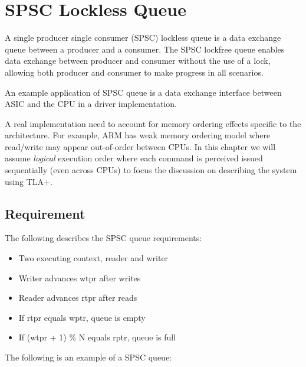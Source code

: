 % 

\chapter{SPSC Lockless Queue}

A single producer single consumer (SPSC) lockless queue is a data exchange queue
between a producer and a consumer. The SPSC lockfree queue enables data exchange
between producer and consumer without the use of a lock, allowing both producer
and consumer to make progress in all scenarios.\newline

An example application of SPSC queue is a data exchange interface between ASIC
and the CPU in a driver implementation.\newline

A real implementation need to account for memory ordering effects specific to
the architecture. For example, ARM has weak memory ordering model where
read/write may appear out-of-order between CPUs. In this chapter we will assume
\textit{logical} execution order where each command is perceived issued
sequentially (even across CPUs) to focus the discussion on describing the system
using TLA+.
\newline

\section{Requirement}

The following describes the SPSC queue requirements: 

\begin{itemize}
    \item Two executing context, reader and writer
    \item Writer advances wtpr after writes
    \item Reader advances rtpr after reads
    \item If rtpr equals wptr, queue is empty
    \item If (wtpr + 1) \% N equals rptr, queue is full
\end{itemize}

The following is an example of a SPSC queue:
\begin{center}
\end{center}


